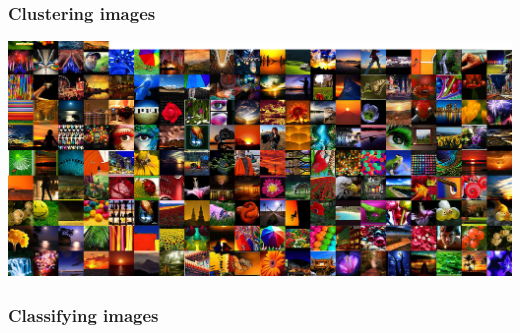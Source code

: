 \begin{frame}
  \frametitle{Clustering images}

  \begin{center}
  \includegraphics[width=\textwidth]{../../code/image_data/flickr_vivid_cluster_0.png}
  \end{center}

\end{frame}


\begin{frame}
  \frametitle{Classifying images}

  \begin{center}
  \end{center}

\end{frame}
